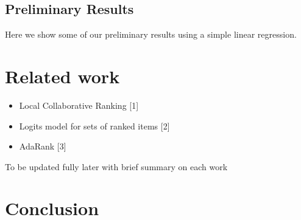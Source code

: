 \documentclass{article} %
\begin{document}



	\subsection{Preliminary Results}
	Here we show some of our preliminary results using a simple linear regression.
	
\section{Related work}
\label{sec:related}

	\begin{itemize}
	\item Local Collaborative Ranking [1]
	\item Logits model for sets of ranked items [2]
	\item AdaRank [3]
	\end{itemize}

To be updated fully later with brief summary on each work

\section{Conclusion}
\label{sec:conclusion}
\end{document}
